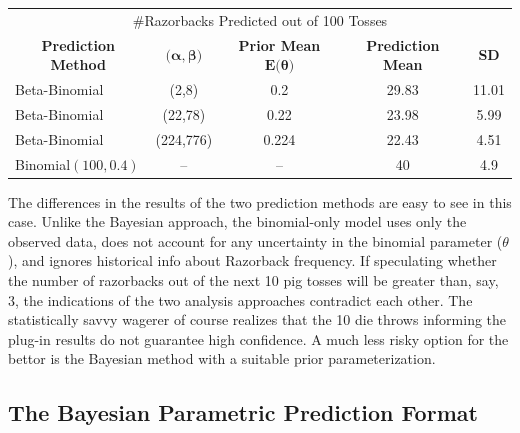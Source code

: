 \documentclass[12pt, a4paper]{article}
\begin{document}
\vspace{1cm}

\begin{center}
  \begin{tabular}{l c c c c }
  \toprule
  \multicolumn{5}{c}{\large \#Razorbacks Predicted out of 100 Tosses}          \\
  \multicolumn{1}{c}{\textbf{Prediction Method}} & \multicolumn{1}{c}{$\textbf{(}\boldsymbol\alpha,\boldsymbol\beta\textbf{)}$}  & \multicolumn{1}{c}{\textbf{Prior Mean }$\textbf{E(}\boldsymbol\theta\textbf{)}$}  & \multicolumn{1}{c}{\textbf{Prediction Mean}} & \multicolumn{1}{c}{\textbf{SD}}\\
        \midrule
        Beta-Binomial & (2,8) & 0.2 & 29.83 & 11.01 \\
        \midrule
        Beta-Binomial & (22,78) & 0.22 & 23.98 & 5.99\\
        \midrule
        Beta-Binomial & (224,776) & 0.224 & 22.43 & 4.51 \\
        \midrule
        Binomial$(100,0.4)$ & -- & -- & 40 & 4.9 \\
  \bottomrule
  \end{tabular}
\end{center}

\vspace{1cm}

\noindent The differences in the results of the two prediction methods are easy to see in this case. Unlike the Bayesian approach, the binomial-only model uses only the observed data, does not account for any uncertainty in the binomial parameter ($\theta$), and ignores historical info about Razorback frequency.  If speculating whether the number of razorbacks out of the next 10 pig tosses will be greater than, say, 3, the indications of the two analysis approaches contradict each other.  The statistically savvy wagerer of course realizes that the 10 die throws informing the plug-in results do not guarantee high confidence.  A much less risky option for the bettor is the Bayesian method with a suitable prior parameterization.


\clearpage

  \subsection{The Bayesian Parametric Prediction Format}
\end{document}
